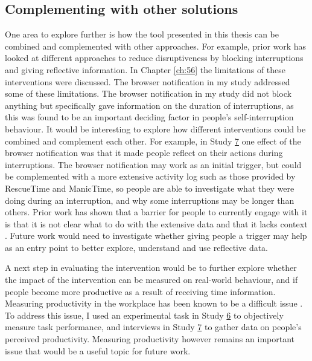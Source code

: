 \subsection{Complementing with other solutions}
One area to explore further is how the tool presented in this thesis can be combined and complemented with other approaches. For example, prior work has looked at different approaches to reduce disruptiveness by blocking interruptions and giving reflective information. In Chapter \ref{ch:56} the limitations of these interventions were discussed. The browser notification in my study addressed some of these limitations. The browser notification in my study did not block anything but specifically gave information on the duration of interruptions, as this was found to be an important deciding factor in people's self-interruption behaviour. It would be interesting to explore how different interventions could be combined and complement each other. For example, in Study \hyperref[st:Study7]{7} one effect of the browser notification was that it made people reflect on their actions during interruptions. The browser notification may work as an initial trigger, but could be complemented with a more extensive activity log such as those provided by RescueTime and ManicTime, so people are able to investigate what they were doing during an interruption, and why some interruptions may be longer than others. Prior work has shown that a barrier for people to currently engage with it is that it is not clear what to do with the extensive data and that it lacks context \citep{Collins2014}. Future work would need to investigate whether giving people a trigger may help as an entry point to better explore, understand and use  reflective data. 

A next step in evaluating the intervention would be to further explore whether the impact of the intervention can be measured on real-world behaviour, and if people become more productive as a result of receiving time information. Measuring productivity in the workplace has been known to be a difficult issue \citep{Mark2015}. To address this issue, I used an experimental task in Study \hyperref[st:Study6]{6} to objectively measure task performance, and interviews in Study \hyperref[st:Study7]{7} to gather data on people’s perceived productivity. Measuring productivity however remains an important issue that would be a useful topic for future work. 

